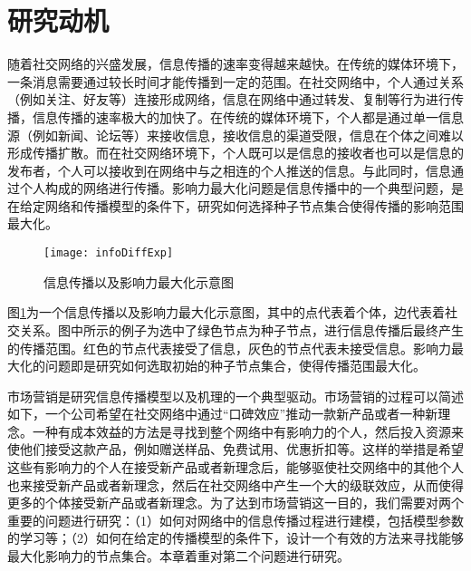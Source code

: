 \section{研究动机}
\label{sec4:motivation}
随着社交网络的兴盛发展，信息传播的速率变得越来越快。在传统的媒体环境下，一条消息需要通过较长时间才能传播到一定的范围。在社交网络中，个人通过关系（例如关注、好友等）连接形成网络，信息在网络中通过转发、复制等行为进行传播，信息传播的速率极大的加快了。在传统的媒体环境下，个人都是通过单一信息源（例如新闻、论坛等）来接收信息，接收信息的渠道受限，信息在个体之间难以形成传播扩散。而在社交网络环境下，个人既可以是信息的接收者也可以是信息的发布者，个人可以接收到在网络中与之相连的个人推送的信息。与此同时，信息通过个人构成的网络进行传播。影响力最大化问题是信息传播中的一个典型问题，是在给定网络和传播模型的条件下，研究如何选择种子节点集合使得传播的影响范围最大化。
\begin{figure}[!ht]
    \centering
    \texttt{[image: infoDiffExp]}
    \caption{信息传播以及影响力最大化示意图}
    \label{fig:infoDiffExp}
\end{figure}

图\ref{fig:infoDiffExp}为一个信息传播以及影响力最大化示意图，其中的点代表着个体，边代表着社交关系。图中所示的例子为选中了绿色节点为种子节点，进行信息传播后最终产生的传播范围。红色的节点代表接受了信息，灰色的节点代表未接受信息。影响力最大化的问题即是研究如何选取初始的种子节点集合，使得传播范围最大化。

市场营销是研究信息传播模型以及机理的一个典型驱动。市场营销的过程可以简述如下，一个公司希望在社交网络中通过“口碑效应”推动一款新产品或者一种新理念。一种有成本效益的方法是寻找到整个网络中有影响力的个人，然后投入资源来使他们接受这款产品，例如赠送样品、免费试用、优惠折扣等。这样的举措是希望这些有影响力的个人在接受新产品或者新理念后，能够驱使社交网络中的其他个人也来接受新产品或者新理念，然后在社交网络中产生一个大的级联效应，从而使得更多的个体接受新产品或者新理念。为了达到市场营销这一目的，我们需要对两个重要的问题进行研究：（1）如何对网络中的信息传播过程进行建模，包括模型参数的学习等；（2）如何在给定的传播模型的条件下，设计一个有效的方法来寻找能够最大化影响力的节点集合。本章着重对第二个问题进行研究。

